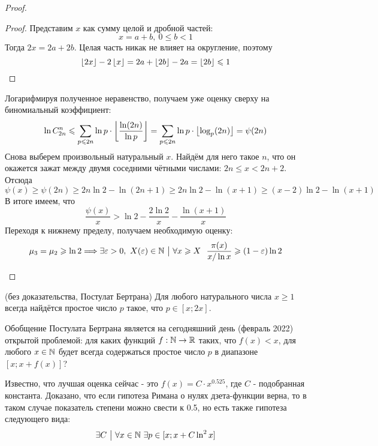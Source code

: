 \begin{proof}
\begin{itemize}
		\begin{proof}
			Представим $x$ как сумму целой и дробной частей:
			\[
				x = a + b,\ 0 \le b < 1
			\]
			Тогда $2x = 2a + 2b$. Целая часть никак не влияет на округление, поэтому
			\[
				\left\lfloor 2x \right\rfloor - 2\left\lfloor x \right\rfloor = 2a + \left\lfloor 2b \right\rfloor - 2a = \left\lfloor 2b \right\rfloor \leqslant 1
			\]
		\end{proof}
	
		Логарифмируя полученное неравенство, получаем уже оценку сверху на биномиальный коэффициент:
		\[
			\ln C_{2n}^n \leqslant \sum\limits_{p \leqslant 2n} \ln p \cdot \left\lfloor \frac{\ln (2n)}{\ln p} \right\rfloor = \sum\limits_{p \leqslant 2n} \ln p \cdot \left\lfloor \log_p (2n) \right\rfloor = \psi(2n)
		\]
		Снова выберем произвольный натуральный $x$. Найдём для него такое $n$, что он окажется зажат между двумя соседними чётными числами: $2n \le x < 2n + 2$. Отсюда
		\[
			\psi(x) \ge \psi(2n) \ge 2n\ln 2 - \ln (2n + 1) \ge 2n\ln 2 - \ln(x + 1) \ge (x - 2)\ln 2 - \ln (x + 1)
		\]
		В итоге имеем, что
		\[
			\frac{\psi(x)}{x} > \ln 2 - \frac{2\ln 2}{x} - \frac{\ln(x + 1)}{x}
		\]
		Переходя к нижнему пределу, получаем необходимую оценку:
		\[
			\mu_3 = \mu_2 \geqslant \ln 2 \Longrightarrow \exists \varepsilon > 0,\ X(\varepsilon) \in \mathbb{N} \ \big|\  \forall x \geqslant X\ \ \frac{\pi(x)}{x / \ln x} \geqslant (1 - \varepsilon)\ln 2
		\]
	\end{itemize}
\end{proof}

\begin{theorem} (без доказательства, Постулат Бертрана)
	Для любого натурального числа $x \ge 1$ всегда найдётся простое число $p$ такое, что $p \in [x; 2x]$.
\end{theorem}

\begin{note}
	Обобщение Постулата Бертрана является на сегодняшний день (февраль 2022) открытой проблемой: для каких функций $f: \mathbb{N} \to \mathbb{R}$ таких, что $f(x) < x$, для любого $x \in \mathbb{N}$ будет всегда содержаться простое число $p$ в диапазоне $[x; x + f(x)]$?
	
	Известно, что лучшая оценка сейчас - это $f(x) = C \cdot x^{0.525}$, где $C$ - подобранная константа. Доказано, что если гипотеза Римана о нулях дзета-функции верна, то в таком случае показатель степени можно свести к 0.5, но есть также гипотеза следующего вида:
	\[
		\exists C \ \big|\  \forall x \in \mathbb{N}\ \exists p \in [x; x + C\ln^2 x]
	\]
\end{note}